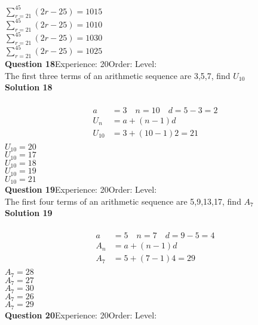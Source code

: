 \documentclass{article}
\begin{document}
$\displaystyle\sum_{r=21}^{45} (2r-25)=1015$\\
$\displaystyle\sum_{r=21}^{45} (2r-25)=1010$\\
$\displaystyle\sum_{r=21}^{45} (2r-25)=1030$\\
$\displaystyle\sum_{r=21}^{45} (2r-25)=1025$\\
\noindent\textbf{Question 18}\hspace{20pt}Experience: 20\hspace{20pt}Order: \hspace{20pt}Level: \\[2pt]
The first three terms of an arithmetic sequence are 3,5,7, find $U_{10}$\\[4pt]
\noindent\textbf{Solution 18}\\[2pt]
\\[-10pt]\begin{align*}
a&=3\quad n=10 \quad d=5-3=2\\[2pt]
U_n&=a+(n-1)d\\[12pt]
U_{10}&=3+(10-1)2=21\\[2pt]
\end{align*}
$U_{10}=20$\\
$U_{10}=17$\\
$U_{10}=18$\\
$U_{10}=19$\\
$U_{10}=21$\\
\noindent\textbf{Question 19}\hspace{20pt}Experience: 20\hspace{20pt}Order: \hspace{20pt}Level: \\[2pt]
The first four terms of an arithmetic sequence are 5,9,13,17, find $A_7$\\[4pt]
\noindent\textbf{Solution 19}\\[2pt]
\\[-10pt]\begin{align*}
a&=5 \quad n=7 \quad d=9-5=4\\[2pt]
A_n&=a+(n-1)d\\[2pt]
A_7&=5+(7-1)4=29\\[2pt]
\end{align*}
$A_7=28$\\
$A_7=27$\\
$A_7=30$\\
$A_7=26$\\
$A_7=29$\\
\noindent\textbf{Question 20}\hspace{20pt}Experience: 20\hspace{20pt}Order: \hspace{20pt}Level: \\[2pt]
\end{document}
